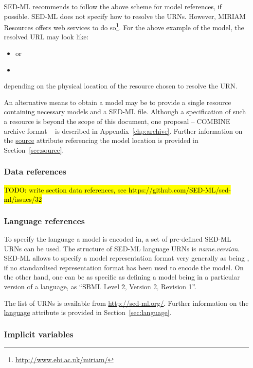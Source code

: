 SED-ML recommends to follow the above scheme for model references, if possible. 
SED-ML does not specify how to resolve the URNs. However, MIRIAM Resources offers web services to do so\footnote{\url{http://www.ebi.ac.uk/miriam/}}. For the above example of the  model, the resolved URL may look like: 
\begin{itemize}
 \item{ or}
 \item{}
\end{itemize}
depending on the physical location of the resource chosen to resolve the URN.

An alternative means to obtain a model may be to provide a single resource containing necessary models and a SED-ML file. Although a specification of such a resource is beyond the scope of this document,  one proposal  --  COMBINE archive format -- is  described in Appendix~\ref{chp:archive}.
Further information on the \hyperref[sec:source]{source} attribute referencing the model location is provided in Section~\ref{sec:source}.

\subsubsection{Data references}
\label{sec:dataURI}
\hl{TODO: write section data references, see https://github.com/SED-ML/sed-ml/issues/32}

\subsubsection{Language references}
\label{sec:languageURI}
To specify the language a model is encoded in, a set of pre-defined SED-ML URNs can be used. 
The structure of SED-ML language URNs is \emph{name.version}. 
SED-ML allows to specify a model representation format very generally as being , if no standardised representation format has been used to encode the model. On the other hand, one can be as specific as defining
a model being in a particular version of a language, as ``SBML Level 2, Version 2, Revision 1''.

The list of URNs is available from \url{http://sed-ml.org/}. 
Further information on the \hyperref[sec:language]{language} attribute is provided in Section~\ref{sec:language}.

\subsubsection{Implicit variables}
\label{sec:implicitVariableURI}

